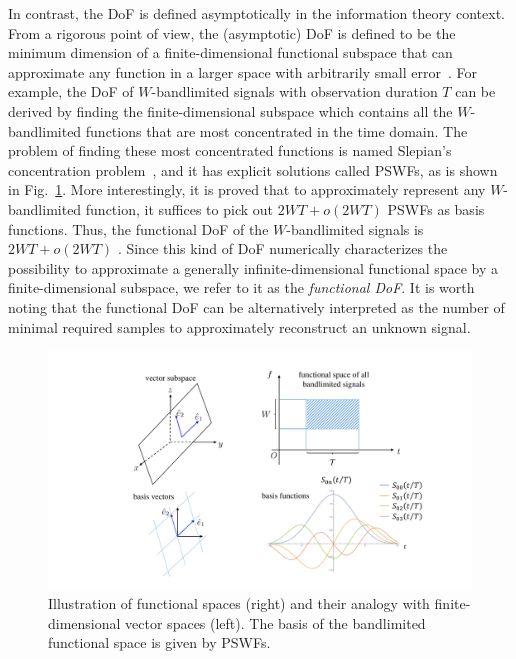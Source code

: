 \documentclass[journal,twocolumn]{IEEEtran}
\begin{document}
In contrast, the DoF is defined asymptotically in the information theory context. From a rigorous point of view, the (asymptotic) DoF is defined to be the minimum dimension of a finite-dimensional functional subspace that can approximate any function in a larger space with arbitrarily small error~\cite{poon2005degrees}. For example, the DoF of $W$-bandlimited signals with observation duration $T$ can be derived by finding the finite-dimensional subspace which contains all the $W$-bandlimited functions that are most concentrated in the time domain. The problem of finding these most concentrated functions is named Slepian's concentration problem~\cite{slepian1976bandwidth}, and it has explicit solutions called PSWFs, as is shown in Fig.~\ref{fig:PSWF}.
More interestingly, it is proved that to approximately represent any $W$-bandlimited function, it suffices to pick out $2WT+o(2WT)$ PSWFs as basis functions. Thus, the functional DoF of the $W$-bandlimited signals is $2WT+o(2WT)$ \cite{slepian1976bandwidth}. 
Since this kind of DoF numerically characterizes the possibility to approximate a generally infinite-dimensional functional space by a finite-dimensional subspace, we refer to it as the {{\emph{functional DoF}}}. 
It is worth noting that the functional DoF can be alternatively interpreted as the number of minimal required samples to approximately reconstruct an unknown signal. 
\begin{figure}
	\centering 
	\includegraphics[width=\linewidth]{figures/PSWF.pdf} 
	\caption{Illustration of functional spaces (right) and their analogy with finite-dimensional vector spaces (left). The basis of the bandlimited functional space is given by PSWFs. }
	\label{fig:PSWF}
\end{figure}
\end{document}
